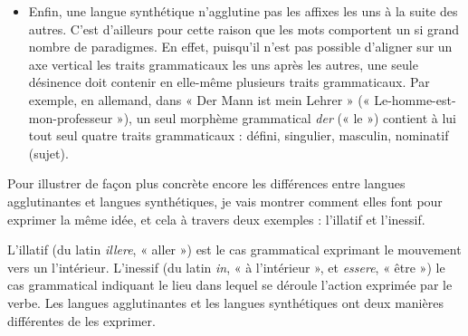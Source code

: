 \begin{itemize}
\item Enfin, une langue synthétique n’agglutine pas les affixes les uns à la suite des autres. C’est d’ailleurs pour cette raison que les mots comportent un si grand nombre de paradigmes. En effet, puisqu’il n’est pas possible d’aligner sur un axe vertical les traits grammaticaux les uns après les autres, une seule désinence doit contenir en elle-même plusieurs traits grammaticaux. Par exemple, en allemand, dans « Der Mann ist mein Lehrer » (« Le-homme-est-mon-professeur »), un seul morphème grammatical \textit{der} (« le ») contient à lui tout seul quatre traits grammaticaux : défini, singulier, masculin, nominatif (sujet).
\end{itemize}

Pour illustrer de façon plus concrète encore les différences entre langues agglutinantes et langues synthétiques, je vais montrer comment elles font pour exprimer la même idée, et cela à travers deux exemples : l’illatif et l’inessif.

L’illatif (du latin \textit{illere}, « aller ») est le cas grammatical exprimant le mouvement vers un l’intérieur. L’inessif (du latin \textit{in}, « à l’intérieur », et \textit{essere}, « être ») le cas grammatical indiquant le lieu dans lequel se déroule l’action exprimée par le verbe. Les langues agglutinantes et les langues synthétiques ont deux manières différentes de les exprimer.

